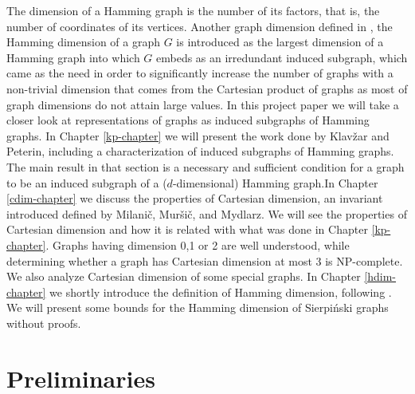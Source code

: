 \documentclass[12pt,a4paper,titlepage,openany]{report}
\begin{document}
The dimension of a Hamming graph is the number of its factors, that is, the number of coordinates of its vertices.\newline
Another graph dimension defined in \cite{Sandi}, the Hamming dimension of a graph $G$ is introduced as the largest dimension of a Hamming graph into which $G$ embeds as an irredundant induced subgraph, which came as the need in order to significantly increase the number of graphs with a non-trivial dimension that comes from the Cartesian product of graphs as most of graph dimensions do not attain large values.
\newline
In this project paper we will take a closer look at representations of graphs as induced subgraphs of Hamming graphs. In Chapter \ref{kp-chapter} we will present the work done by Klav\v zar and Peterin, including a characterization of induced subgraphs of Hamming graphs. The main result in that section is a necessary and sufficient condition for a graph to be an induced subgraph of a ($d$-dimensional) Hamming graph.\newline In Chapter \ref{cdim-chapter} we discuss the properties of Cartesian dimension, an invariant introduced defined by Milani\v c, Mur\v si\v c, and Mydlarz. We will see the properties of Cartesian dimension and how it is related with what was done in Chapter \ref{kp-chapter}. Graphs having dimension 0,1 or 2 are well understood, while determining whether a graph has Cartesian dimension at most 3 is NP-complete. We also analyze Cartesian dimension of some special graphs.\newline
In Chapter \ref{hdim-chapter} we shortly introduce the definition of Hamming dimension, following \cite{Sandi}. We will present some bounds for the Hamming dimension of Sierpi\'nski graphs without proofs.



\chapter{Preliminaries}
\thispagestyle{fancy}
\end{document}
